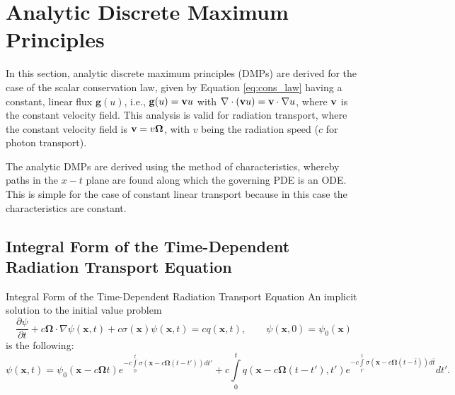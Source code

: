 \section{Analytic Discrete Maximum Principles}
In this section, analytic discrete maximum principles (DMPs) are derived
for the case of the scalar conservation law, given by Equation
\eqref{eq:cons_law} having a constant, linear flux $\mathbf{g}(u)$, i.e.,
$\mathbf{g}(u) = \mathbf{v} u$ with $\nabla\cdot(\mathbf{v} u) = \mathbf{v}\cdot\nabla u$,
where $\mathbf{v}$ is the constant velocity field. This analysis is valid for
radiation transport, where the constant velocity field is $\mathbf{v}=v\mathbf{\Omega}$, with
$v$ being the radiation speed ($c$ for photon transport).

The analytic DMPs are derived using the method of characteristics, whereby
paths in the $x-t$ plane are found along which the governing PDE is an ODE.
This is simple for the case of constant linear transport because in this case
the characteristics are constant.

\subsection{Integral Form of the Time-Dependent Radiation Transport Equation}
\begin{theorem}{Integral Form of the Time-Dependent Radiation Transport Equation}{}
   An implicit solution to the initial value problem
   \begin{equation}\label{PDE}
      \frac{\partial \psi}{\partial t} + c\mathbf{\Omega}\cdot\nabla\psi(\mathbf{x},t)
      + c\sigma(\mathbf{x})\psi(\mathbf{x},t) = c q(\mathbf{x},t),
      \qquad \psi(\mathbf{x},0) = \psi_0(\mathbf{x})
   \end{equation}
   is the following:
   \begin{equation}\label{exact}
      \psi(\mathbf{x},t) = \psi_0(\mathbf{x} - c\mathbf{\Omega}t)
         e^{-c\int\limits_0^t \sigma(\mathbf{x} - c\mathbf{\Omega}(t -t'))dt'} +
         c \int\limits_0^t q(\mathbf{x} - c\mathbf{\Omega}(t -t'),t')
         e^{-c\int\limits_{t'}^t\sigma(\mathbf{x}
         - c\mathbf{\Omega}(t -\bar{t}))d\bar{t}} dt'.
   \end{equation}
\end{theorem}

